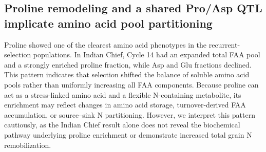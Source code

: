 


\subsection{Proline remodeling and a shared Pro/Asp QTL implicate amino acid pool partitioning}

Proline showed one of the clearest amino acid phenotypes in the recurrent-selection populations. In Indian Chief, Cycle 14 had an expanded total FAA pool and a strongly enriched proline fraction, while Asp and Glu fractions declined. This pattern indicates that selection shifted the balance of soluble amino acid pools rather than uniformly increasing all FAA components. Because proline can act as a stress-linked amino acid and a flexible N-containing metabolite, its enrichment may reflect changes in amino acid storage, turnover-derived FAA accumulation, or source--sink N partitioning. However, we interpret this pattern cautiously, as the Indian Chief result alone does not reveal the biochemical pathway underlying proline enrichment or demonstrate increased total grain N remobilization.

